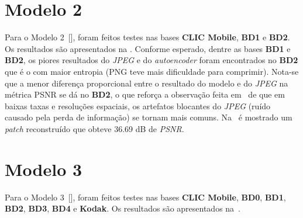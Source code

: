 \section{Modelo 2}
\label{res:mod2}
Para o Modelo 2~[], foram feitos testes nas bases \textbf{\acrshort{CLIC} Mobile}, \textbf{BD1} e \textbf{BD2}. Os resultados são apresentados na . Conforme esperado, dentre as bases \textbf{BD1} e \textbf{BD2}, os piores resultados do \textit{JPEG} e do \textit{autoencoder} foram encontrados no \textbf{BD2} que é o com maior entropia (\acrshort{PNG} teve mais dificuldade para comprimir). Nota-se que a menor diferença proporcional entre o resultado do modelo e do \textit{JPEG} na métrica \acrshort{PSNR} se dá no \textbf{BD2}, o que reforça a observação feita em~\cite{toderici2015variable} de que em baixas taxas e resoluções espaciais, os artefatos blocantes do \textit{JPEG} (ruído causado pela perda de informação) se tornam mais comuns. Na~ é mostrado um \textit{patch} reconstruído que obteve 36.69 \acrshort{dB} de \textit{PSNR}.
\section{Modelo 3}
\label{res:mod3}
Para o Modelo 3~[], foram feitos testes nas bases \textbf{\acrshort{CLIC} Mobile}, \textbf{BD0}, \textbf{BD1}, \textbf{BD2}, \textbf{BD3}, \textbf{BD4} e \textbf{Kodak}. Os resultados são apresentados na~.


